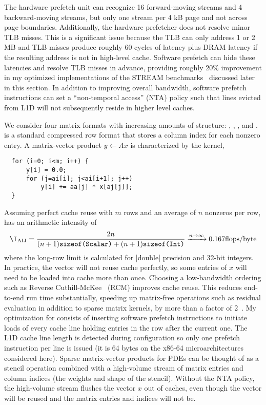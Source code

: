 The hardware prefetch unit can recognize 16 forward-moving streams and 4 backward-moving streams, but only one stream per 4 kB page and not across page boundaries.
Additionally, the hardware prefetcher does not resolve minor TLB misses.
This is a significant issue because the TLB can only address 1 or 2 MB and TLB misses produce roughly 60 cycles of latency plus DRAM latency if the resulting address is not in high-level cache.
Software prefetch can hide these latencies and resolve TLB misses in advance, providing roughly 20\% improvement in my optimized implementations of the STREAM benchmarks~\citep{mccalpin2007stream} discussed later in this section.
In addition to improving overall bandwidth, software prefetch instructions can set a ``non-temporal access'' (NTA) policy such that lines evicted from L1D will not subsequently reside in higher level caches.

We consider four matrix formats with increasing amounts of structure: {\AIJ}, {\AIJInode}, {\BAIJ}, and {\SBAIJ}.
{\AIJ} is a standard compressed row format that stores a column index for each nonzero entry.
A matrix-vector product $y \gets A x$ is characterized by the {\MatMult} kernel,
\begin{verbatim}
  for (i=0; i<m; i++) {
      y[i] = 0.0;
      for (j=ai[i]; j<ai[i+1]; j++)
          y[i] += aa[j] * x[aj[j]];
  }
\end{verbatim}
Assuming perfect cache reuse with $m$ rows and an average of $n$ nonzeros per row, {\MatMult} has an arithmetic intensity of
\begin{align*}
  \I_{\text{AIJ}} = \frac{2n}{(n+1)\texttt{sizeof(Scalar)} + (n+1)\texttt{sizeof(Int)}} \xrightarrow{n\to\infty} 0.167 \text{flops/byte}
\end{align*}
where the long-row limit is calculated for \cverb|double| precision and 32-bit integers.
In practice, the vector will not reuse cache perfectly, so some entries of $x$ will need to be loaded into cache more than once.
Choosing a low-bandwidth ordering such as Reverse Cuthill-McKee~\citep{cuthill1969reducing} (RCM) improves cache reuse.
This reduces end-to-end run time substantially, speeding up matrix-free operations such as residual evaluation in addition to sparse matrix kernels, \eg by more than a factor of 2~\citep{gropp2000pmt}.
My optimization for {\AIJ} consists of inserting software prefetch instructions to initiate loads of every cache line holding entries in the row after the current one.
The L1D cache line length is detected during configuration so only one prefetch instruction per line is issued (it is 64 bytes on the x86-64 microarchitectures considered here).
Sparse matrix-vector products for PDEs can be thought of as a stencil operation combined with a high-volume stream of matrix entries and column indices (the weights and shape of the stencil).
Without the NTA policy, the high-volume stream flushes the vector $x$ out of caches, even though the vector will be reused and the matrix entries and indices will not be.

